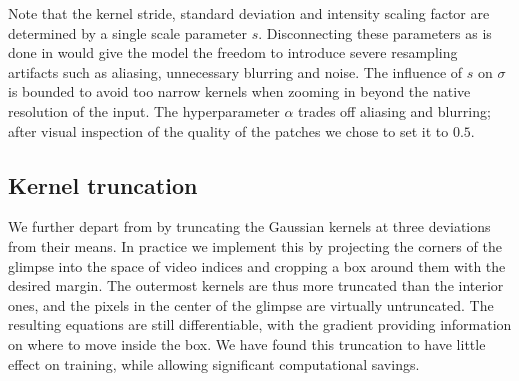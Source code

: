 \documentclass{article} %
\begin{document}
Note that the kernel stride, standard deviation and intensity scaling factor are determined by a single scale parameter $s$.
Disconnecting these parameters as is done in \cite{draw} would give the model the freedom to introduce severe resampling artifacts such as aliasing, unnecessary blurring and noise.
The influence of $s$ on $\sigma$ is bounded to avoid too narrow kernels when zooming in beyond the native resolution of the input.
The hyperparameter $\alpha$ trades off aliasing and blurring; after visual inspection of the quality of the patches we chose to set it to $0.5$.

\subsection{Kernel truncation}

We further depart from \cite{draw} by truncating the Gaussian kernels at three deviations from their means.
In practice we implement this by projecting the corners of the glimpse into the space of video indices and cropping a box around them with the desired margin.
The outermost kernels are thus more truncated than the interior ones, and the pixels in the center of the glimpse are virtually untruncated.
The resulting equations are still differentiable, with the gradient providing information on where to move inside the box.
We have found this truncation to have little effect on training, while allowing significant computational savings.
\end{document}
